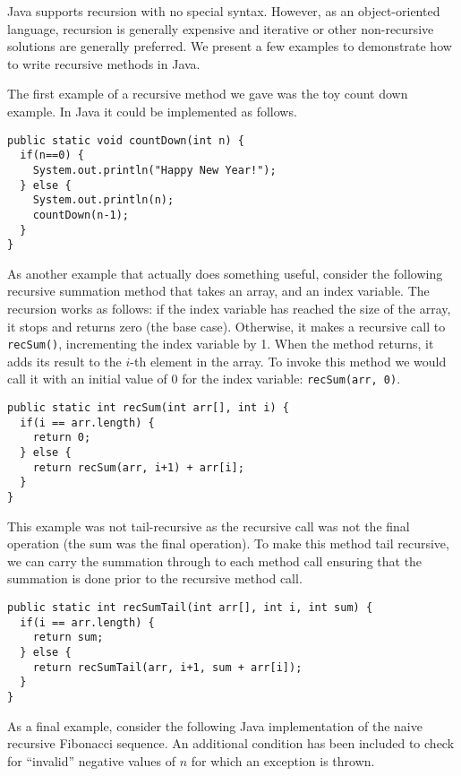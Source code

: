 

Java supports recursion with no special syntax.  However, as an object-oriented language, recursion is generally expensive and iterative or
other non-recursive solutions are generally preferred.  We present
a few examples to demonstrate how to write recursive methods in Java.

The first example of a recursive method we gave was the toy count down
example.  In Java it could be implemented as follows.

\begin{verbatim}
public static void countDown(int n) {
  if(n==0) {
    System.out.println("Happy New Year!");
  } else {
    System.out.println(n);
    countDown(n-1);
  }
}
\end{verbatim}

As another example that actually does something useful, consider the
following recursive summation method that takes an array, 
and an index variable.  The recursion works as follows: if the index
variable has reached the size of the array, it stops and returns zero
(the base case).  Otherwise, it makes a recursive call to 
\texttt{recSum()}, incrementing the index variable by 1.  When
the method returns, it adds its result to the $i$-th element
in the array.  To invoke this method we would call it with an initial
value of 0 for the index variable: \texttt{recSum(arr, 0)}.

\begin{verbatim}
public static int recSum(int arr[], int i) {
  if(i == arr.length) {
    return 0;
  } else {
    return recSum(arr, i+1) + arr[i];
  }
}
\end{verbatim}

This example was not tail-recursive as the recursive call was not the
final operation (the sum was the final operation).  To make this method
tail recursive, we can carry the summation through to each method call
ensuring that the summation is done prior to the recursive method call.

\begin{verbatim}
public static int recSumTail(int arr[], int i, int sum) {
  if(i == arr.length) {
    return sum;
  } else {
    return recSumTail(arr, i+1, sum + arr[i]);
  }
}
\end{verbatim}

As a final example, consider the following Java implementation of the 
naive recursive Fibonacci sequence.  An additional condition has been
included to check for ``invalid'' negative values of $n$ for which
an exception is thrown.

